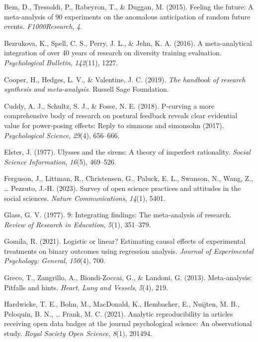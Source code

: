 \documentclass[
  man]{apa6}
\newlength{\cslhangindent}
\newenvironment{CSLReferences}[2] %
 {\begin{list}{}{%
  \setlength{\itemindent}{0pt}
  \setlength{\leftmargin}{0pt}
  \setlength{\parsep}{0pt}
  \ifodd #1
   \setlength{\leftmargin}{\cslhangindent}
   \setlength{\itemindent}{-1\cslhangindent}
  \fi
  \setlength{\itemsep}{#2\baselineskip}}}
 {\end{list}}
\begin{document}
\label{refs}
\begin{CSLReferences}{1}{0}
Bem, D., Tressoldi, P., Rabeyron, T., \& Duggan, M. (2015). Feeling the future: A meta-analysis of 90 experiments on the anomalous anticipation of random future events. \emph{F1000Research}, \emph{4}.

Bezrukova, K., Spell, C. S., Perry, J. L., \& Jehn, K. A. (2016). A meta-analytical integration of over 40 years of research on diversity training evaluation. \emph{Psychological Bulletin}, \emph{142}(11), 1227.

Cooper, H., Hedges, L. V., \& Valentine, J. C. (2019). \emph{The handbook of research synthesis and meta-analysis}. Russell Sage Foundation.

Cuddy, A. J., Schultz, S. J., \& Fosse, N. E. (2018). P-curving a more comprehensive body of research on postural feedback reveals clear evidential value for power-posing effects: Reply to simmons and simonsohn (2017). \emph{Psychological Science}, \emph{29}(4), 656--666.

Elster, J. (1977). Ulysses and the sirens: A theory of imperfect rationality. \emph{Social Science Information}, \emph{16}(5), 469--526.

Ferguson, J., Littman, R., Christensen, G., Paluck, E. L., Swanson, N., Wang, Z., \ldots{} Pezzuto, J.-H. (2023). Survey of open science practices and attitudes in the social sciences. \emph{Nature Communications}, \emph{14}(1), 5401.

Glass, G. V. (1977). 9: Integrating findings: The meta-analysis of research. \emph{Review of Research in Education}, \emph{5}(1), 351--379.

Gomila, R. (2021). Logistic or linear? Estimating causal effects of experimental treatments on binary outcomes using regression analysis. \emph{Journal of Experimental Psychology: General}, \emph{150}(4), 700.

Greco, T., Zangrillo, A., Biondi-Zoccai, G., \& Landoni, G. (2013). Meta-analysis: Pitfalls and hints. \emph{Heart, Lung and Vessels}, \emph{5}(4), 219.

Hardwicke, T. E., Bohn, M., MacDonald, K., Hembacher, E., Nuijten, M. B., Peloquin, B. N., \ldots{} Frank, M. C. (2021). Analytic reproducibility in articles receiving open data badges at the journal psychological science: An observational study. \emph{Royal Society Open Science}, \emph{8}(1), 201494.


\end{CSLReferences}
\end{document}

